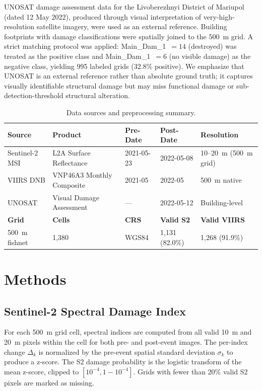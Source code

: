 \documentclass[wcp]{jmlr}
\begin{document}
UNOSAT damage assessment data for the Livoberezhnyi District of Mariupol
(dated 12 May 2022), produced through visual interpretation of
very-high-resolution satellite imagery, were used as an external reference.
Building footprints with damage classifications were spatially joined to
the 500~m grid. A strict matching protocol was applied: Main\_Dam\_1~$=14$
(destroyed) was treated as the positive class and Main\_Dam\_1~$=6$ (no
visible damage) as the negative class, yielding 995 labeled grids (32.8\%
positive). We emphasize that UNOSAT is an external reference rather than
absolute ground truth; it captures visually identifiable structural damage
but may miss functional damage or sub-detection-threshold structural
alteration.

\begin{table}[htp]
\centering
\caption{Data sources and preprocessing summary.}
\label{tab:data}
\begin{tabular}{@{}lllll@{}}
\toprule
\textbf{Source} & \textbf{Product} & \textbf{Pre-Date} & \textbf{Post-Date} & \textbf{Resolution} \\
\midrule
Sentinel-2 MSI  & L2A Surface Reflectance  & 2021-05-23 & 2022-05-08 & 10--20~m (500~m grid) \\
VIIRS DNB       & VNP46A3 Monthly Composite & 2021-05    & 2022-05    & 500~m native \\
UNOSAT          & Visual Damage Assessment  & ---        & 2022-05-12 & Building-level \\
\midrule
\textbf{Grid}   & \textbf{Cells} & \textbf{CRS} & \textbf{Valid S2} & \textbf{Valid VIIRS} \\
500~m fishnet   & 1{,}380        & WGS84        & 1{,}131 (82.0\%)   & 1{,}268 (91.9\%) \\
\bottomrule
\end{tabular}
\end{table}

\section{Methods}\label{sec:methods}

\subsection{Sentinel-2 Spectral Damage Index}

For each 500~m grid cell, spectral indices are computed from all valid
10~m and 20~m pixels within the cell for both pre- and post-event images.
The per-index change $\Delta_k$ is normalized by the pre-event spatial
standard deviation $\sigma_k$ to produce a z-score. The S2 damage
probability is the logistic transform of the mean z-score, clipped to
$[10^{-4}, 1-10^{-4}]$. Grids with fewer than 20\% valid S2 pixels
are marked as missing.
\end{document}
